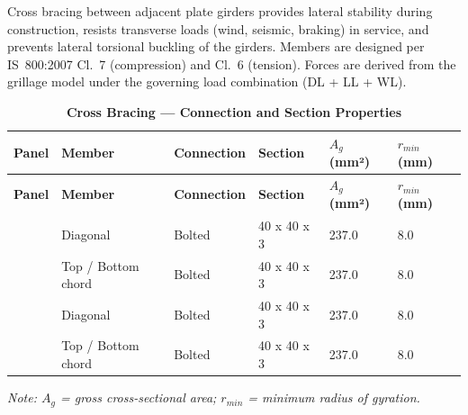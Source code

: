\documentclass[12pt,a4paper]{report}
\numberwithin{table}{chapter}
\numberwithin{figure}{chapter}
\begin{document}
Cross bracing between adjacent plate girders provides lateral stability during construction, resists transverse loads (wind, seismic, braking) in service, and prevents lateral torsional buckling of the girders. Members are designed per IS~800:2007 Cl.~7 (compression) and Cl.~6 (tension). Forces are derived from the grillage model under the governing load combination  (DL + LL + WL).

\vspace{1em}

\vspace{0.4em}
\noindent
\setlength{\tabcolsep}{4pt}
\setlength\LTleft{0pt}
\setlength\LTright{\fill}

\begin{longtable}{|C{2.0cm}|L{2.0cm}|L{2.2cm}|C{2.5cm}|C{2.0cm}|C{2.0cm}|}
\caption{\textbf{Cross Bracing --- Connection and Section Properties}}\\
\hline
\textbf{Panel} & \textbf{Member} & \textbf{Connection} & \textbf{Section} & \textbf{$A_g$ (mm²)} & \textbf{$r_{min}$ (mm)} \\[6pt]
\hline
\endfirsthead

\hline
\textbf{Panel} & \textbf{Member} & \textbf{Connection} & \textbf{Section} & \textbf{$A_g$ (mm²)} & \textbf{$r_{min}$ (mm)} \\[6pt]
\hline
\endhead
\hline
\endlastfoot
{} & Diagonal & Bolted & 40 x 40 x 3 & 237.0 & 8.0 \\[6pt]
 & Top / Bottom chord & Bolted & 40 x 40 x 3 & 237.0 & 8.0 \\[6pt]
\hline
{} & Diagonal & Bolted & 40 x 40 x 3 & 237.0 & 8.0 \\[6pt]
 & Top / Bottom chord & Bolted & 40 x 40 x 3 & 237.0 & 8.0 \\[6pt]
\end{longtable}
\noindent\textit{Note: $A_g$ = gross cross-sectional area; $r_{min}$ = minimum radius of gyration.}
\end{document}
